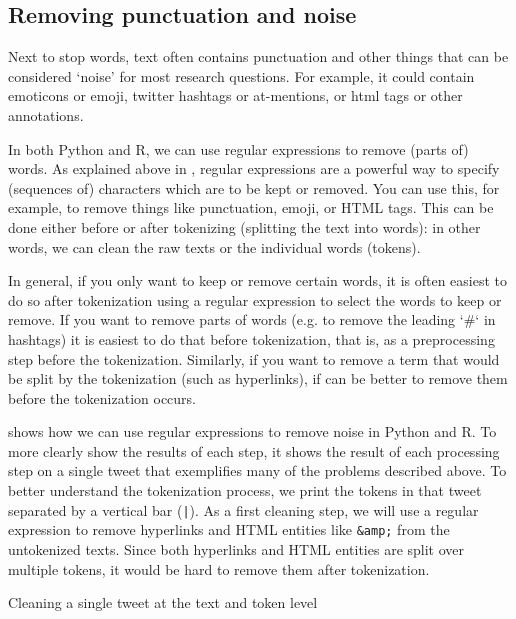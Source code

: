 \subsection{Removing punctuation and noise}


Next to stop words, text often contains punctuation and other things that can be considered `noise' for most research questions.
For example, it could contain emoticons or emoji, twitter hashtags or at-mentions, or html tags or other annotations.

In both Python and R, we can use regular expressions to remove (parts of) words. 
As explained above in , regular expressions are a powerful way to specify (sequences of) characters which are to be kept or removed.
You can use this, for example, to remove things like punctuation, emoji, or HTML tags.
This can be done either before or after tokenizing (splitting the text into words):
in other words, we can clean the raw texts or the individual words (tokens). 

In general, if you only want to keep or remove certain words, it is often easiest to do so after tokenization
using a regular expression to select the words to keep or remove.
If you want to remove parts of words (e.g. to remove the leading `\#` in hashtags) it is easiest to do that before tokenization,
that is, as a preprocessing step before the tokenization.
Similarly, if you want to remove a term that would be split by the tokenization (such as hyperlinks),
if can be better to remove them before the tokenization occurs.

 shows how we can use regular expressions to remove noise in Python and R.
To more clearly show the results of each step, it shows the result of each processing step on a single tweet that exemplifies many of the problems described above.
To better understand the tokenization process, we print the tokens in that tweet separated by a vertical bar (\verb+|+). 
As a first cleaning step, we will use a regular expression to remove hyperlinks and HTML entities like \verb|&amp;| from the untokenized texts.
Since both hyperlinks and HTML entities are split over multiple tokens, it would be hard to remove them after tokenization.

\begin{ccsexample}
\caption{Cleaning a single tweet at the text and token level}\label{ex:noise}
\end{ccsexample}

